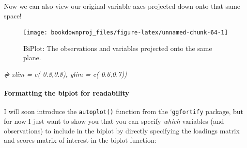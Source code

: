 \documentclass[
]{article}
\newenvironment{Shaded}{\begin{snugshade}}{\end{snugshade}}
\newcommand{\AttributeTok}[1]{\textcolor[rgb]{0.77,0.63,0.00}{#1}}
\newcommand{\CommentTok}[1]{\textcolor[rgb]{0.56,0.35,0.01}{\textit{#1}}}
\newcommand{\DecValTok}[1]{\textcolor[rgb]{0.00,0.00,0.81}{#1}}
\newcommand{\FloatTok}[1]{\textcolor[rgb]{0.00,0.00,0.81}{#1}}
\newcommand{\FunctionTok}[1]{\textcolor[rgb]{0.00,0.00,0.00}{#1}}
\newcommand{\NormalTok}[1]{#1}
\newcommand{\SpecialCharTok}[1]{\textcolor[rgb]{0.00,0.00,0.00}{#1}}
\newcommand{\StringTok}[1]{\textcolor[rgb]{0.31,0.60,0.02}{#1}}
\theoremstyle{definition}
\theoremstyle{definition}
\theoremstyle{definition}
\theoremstyle{definition}
\theoremstyle{remark}
\begin{document}
Now we can also view our original variable axes projected down onto that same space!

\begin{Shaded}
\end{Shaded}

\begin{figure}

{\centering \texttt{[image: bookdownproj\_files/figure-latex/unnamed-chunk-64-1]} 

}

\caption{BiPlot: The observations and variables projected onto the same plane.}\label{fig:unnamed-chunk-64}
\end{figure}

\begin{Shaded}
\begin{Highlighting}[]
      \CommentTok{\# xlim = c({-}0.8,0.8), ylim = c({-}0.6,0.7))}
\end{Highlighting}
\end{Shaded}

\hypertarget{formatting-the-biplot-for-readability}{%
\paragraph{Formatting the biplot for readability}\label{formatting-the-biplot-for-readability}}

I will soon introduce the \texttt{autoplot()} function from the `\texttt{ggfortify} package, but for now I just want to show you that you can specify \emph{which} variables (and observations) to include in the biplot by directly specifying the loadings matrix and scores matrix of interest in the biplot function:
\end{document}
